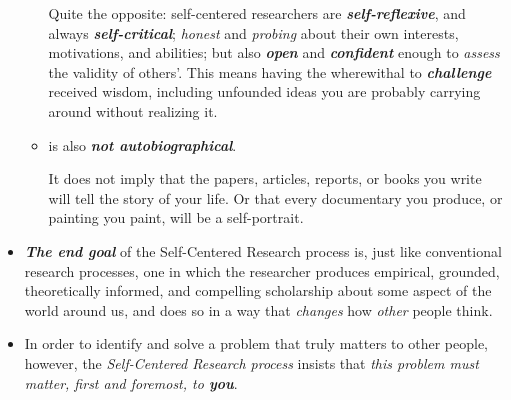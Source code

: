 \documentclass[11pt]{article}
\begin{document}
\begin{itemize}
\begin{itemize}
Quite the opposite: self-centered researchers are \emph{\textbf{self-reflexive}}, and always \emph{\textbf{self-critical}}; \emph{honest} and \emph{probing} about their own interests, motivations, and abilities; but also \emph{\textbf{open}} and \emph{\textbf{confident}} enough to \emph{assess} the validity of others’. This means having the wherewithal to \emph{\textbf{challenge}} received wisdom, including unfounded ideas you are probably carrying around without realizing it.

\item is also \emph{\textbf{not autobiographical}}.

It does not imply that the papers, articles, reports, or books you write will tell the story of your life. Or that every documentary you produce, or painting you paint, will be a self-portrait.
\end{itemize}

\item \emph{\textbf{The end goal}} of the Self-Centered Research process is, just like conventional research processes, one in which the researcher produces empirical, grounded, theoretically informed, and compelling scholarship about some aspect of the world around us, and does so in a way that \emph{changes} how \emph{other} people think. 

\item In order to identify and solve a problem that truly matters to other people, however, the \emph{Self-Centered Research process} insists that \emph{this problem must matter, first and foremost, to \textbf{you}}.
\end{itemize}
\end{document}
